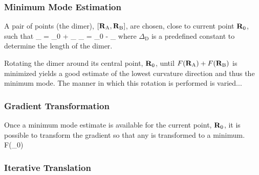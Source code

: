 \subsubsection{Minimum Mode Estimation}
A pair of points (the dimer), $[{\mathrm{\mathbf{\bm{R}}}}_\text{A}, {\mathrm{\mathbf{\bm{R}}}}_\text{B}]$, are chosen, close to current point ${\mathrm{\mathbf{\bm{R}}}}_0$, such that
\vR_ = \vR_0 + \Delta_\uvn \quad {} \quad \vR_ = \vR_0  - \Delta_\uvn
\eeq
where $\Delta_\text{D}$ is a predefined constant to determine the length of the dimer.

Rotating the dimer around its central point, ${\mathrm{\mathbf{\bm{R}}}}_0$, until $F({\mathrm{\mathbf{\bm{R}}}}_\text{A}) + F({\mathrm{\mathbf{\bm{R}}}}_\text{B})$ is minimized yields a good estimate of the lowest curvature direction and thus the minimum mode. \cite{voter-hyperdynamics-1997}
The manner in which this rotation is performed is varied...


\incomplete

\subsubsection{Gradient Transformation}
Once a minimum mode estimate is available for the current point, ${\mathrm{\mathbf{\bm{R}}}}_0$, it is possible to transform the gradient so that any  is transformed to a minimum.
\nabla{}F(\vR_0)
\eeq


\incomplete

\subsubsection{Iterative Translation}

\incomplete
